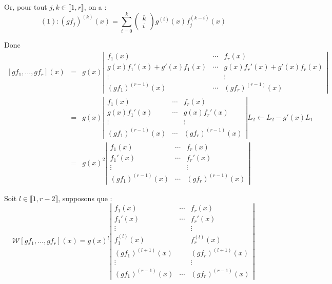 Or, pour tout $j, k \in \llbracket 1, r \rrbracket$, on a :
\[ (1) : (g f_j)^{(k)} (x) = \underset{i = 0}{\overset{k}{\sum}} \left(
   \begin{array}{c}
     k\\
     i
   \end{array} \right) g^{(i)} (x) f^{(k - i)}_j (x) \]

Donc
\begin{eqnarray*}
  {}[gf_1, \ldots, gf_r] (x) & = & g (x) \left| \begin{array}{ccc}
    f_1 (x) & \cdots & f_r (x)\\
    g (x) f_1' (x) + g' (x) f_1 (x) & \cdots & g (x) f_r' (x) + g' (x) f_r
    (x)\\
    \vdots &  & \vdots\\
    (g f_1)^{(r - 1)} (x) & \cdots & (g f_r)^{(r - 1)} (x)
  \end{array} \right|\\
  & = & g (x) \left| \begin{array}{ccc}
    f_1 (x) & \cdots & f_r (x)\\
    g (x) f_1' (x) & \cdots & g (x) f_r' (x)\\
    \vdots &  & \vdots\\
    (g f_1)^{(r - 1)} (x) & \cdots & (g f_r)^{(r - 1)} (x)
  \end{array} \right| L_2 \leftarrow L_2 - g' (x) L_1\\
  & = & g (x)^2 \left| \begin{array}{ccc}
    f_1 (x) & \cdots & f_r (x)\\
    f_1' (x) & \cdots & f_r' (x)\\
    \vdots &  & \vdots\\
    (g f_1)^{(r - 1)} (x) & \cdots & (g f_r)^{(r - 1)} (x)
  \end{array} \right|
\end{eqnarray*}

Soit $l \in \llbracket 1, r - 2 \rrbracket$, supposons que :
\[ \mathcal{W} [gf_1, \ldots, gf_r] (x) = g (x)^l \left| \begin{array}{ccc}
     f_1 (x) & \cdots & f_r (x)\\
     f_1' (x) & \cdots & f_r' (x)\\
     \vdots &  & \vdots\\
     f^{(l)}_1 (x) &  & f^{(l)}_r (x)\\
     (g f_1)^{(l + 1)} (x) &  & (g f_r)^{(l + 1)} (x)\\
     \vdots &  & \vdots\\
     (g f_1)^{(r - 1)} (x) & \cdots & (g f_r)^{(r - 1)} (x)
   \end{array} \right| \]

